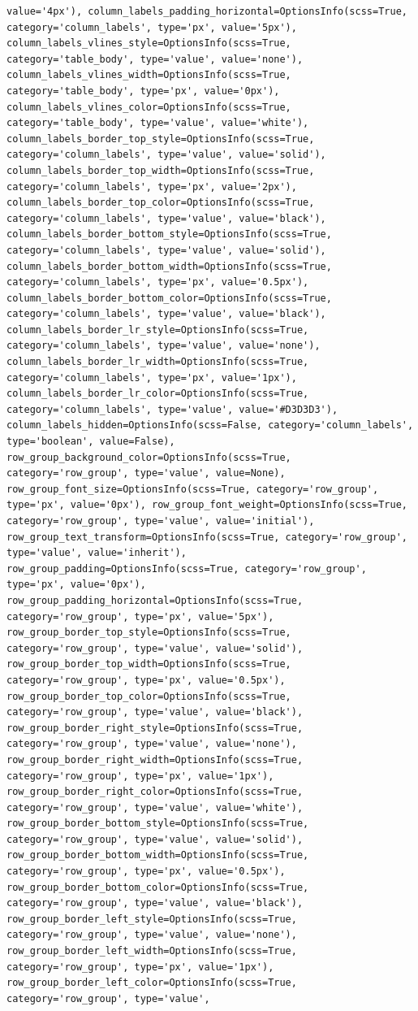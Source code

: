 \documentclass[
  letterpaper,
  DIV=11,
  numbers=noendperiod]{scrreprt}
\newcounter{none} %
\begin{document}
\begin{table}
{\begin{verbatim}
value='4px'), column_labels_padding_horizontal=OptionsInfo(scss=True, category='column_labels', type='px', value='5px'), column_labels_vlines_style=OptionsInfo(scss=True, category='table_body', type='value', value='none'), column_labels_vlines_width=OptionsInfo(scss=True, category='table_body', type='px', value='0px'), column_labels_vlines_color=OptionsInfo(scss=True, category='table_body', type='value', value='white'), column_labels_border_top_style=OptionsInfo(scss=True, category='column_labels', type='value', value='solid'), column_labels_border_top_width=OptionsInfo(scss=True, category='column_labels', type='px', value='2px'), column_labels_border_top_color=OptionsInfo(scss=True, category='column_labels', type='value', value='black'), column_labels_border_bottom_style=OptionsInfo(scss=True, category='column_labels', type='value', value='solid'), column_labels_border_bottom_width=OptionsInfo(scss=True, category='column_labels', type='px', value='0.5px'), column_labels_border_bottom_color=OptionsInfo(scss=True, category='column_labels', type='value', value='black'), column_labels_border_lr_style=OptionsInfo(scss=True, category='column_labels', type='value', value='none'), column_labels_border_lr_width=OptionsInfo(scss=True, category='column_labels', type='px', value='1px'), column_labels_border_lr_color=OptionsInfo(scss=True, category='column_labels', type='value', value='#D3D3D3'), column_labels_hidden=OptionsInfo(scss=False, category='column_labels', type='boolean', value=False), row_group_background_color=OptionsInfo(scss=True, category='row_group', type='value', value=None), row_group_font_size=OptionsInfo(scss=True, category='row_group', type='px', value='0px'), row_group_font_weight=OptionsInfo(scss=True, category='row_group', type='value', value='initial'), row_group_text_transform=OptionsInfo(scss=True, category='row_group', type='value', value='inherit'), row_group_padding=OptionsInfo(scss=True, category='row_group', type='px', value='0px'), row_group_padding_horizontal=OptionsInfo(scss=True, category='row_group', type='px', value='5px'), row_group_border_top_style=OptionsInfo(scss=True, category='row_group', type='value', value='solid'), row_group_border_top_width=OptionsInfo(scss=True, category='row_group', type='px', value='0.5px'), row_group_border_top_color=OptionsInfo(scss=True, category='row_group', type='value', value='black'), row_group_border_right_style=OptionsInfo(scss=True, category='row_group', type='value', value='none'), row_group_border_right_width=OptionsInfo(scss=True, category='row_group', type='px', value='1px'), row_group_border_right_color=OptionsInfo(scss=True, category='row_group', type='value', value='white'), row_group_border_bottom_style=OptionsInfo(scss=True, category='row_group', type='value', value='solid'), row_group_border_bottom_width=OptionsInfo(scss=True, category='row_group', type='px', value='0.5px'), row_group_border_bottom_color=OptionsInfo(scss=True, category='row_group', type='value', value='black'), row_group_border_left_style=OptionsInfo(scss=True, category='row_group', type='value', value='none'), row_group_border_left_width=OptionsInfo(scss=True, category='row_group', type='px', value='1px'), row_group_border_left_color=OptionsInfo(scss=True, category='row_group', type='value', 
\end{verbatim}}
\end{table}
\end{document}
